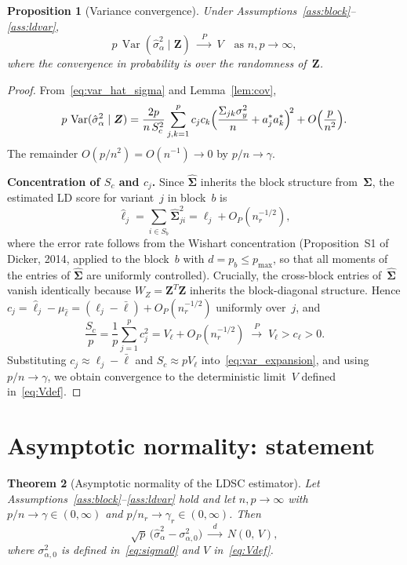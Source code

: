 \documentclass[11pt]{article}
\newcommand{\Var}{\operatorname{Var}}
\newcommand{\Z}{\bm{Z}}
\newcommand{\bSig}{\bm{\Sigma}}
\newcommand{\hSig}{\widehat{\bm{\Sigma}}}
\newtheorem{theorem}{Theorem}
\newtheorem{proposition}[theorem]{Proposition}
\begin{document}
\begin{proposition}[Variance convergence]\label{prop:variance}
Under Assumptions~\ref{ass:block}--\ref{ass:ldvar},
\[
  p\,\Var(\hat\sigma_\alpha^{2}\mid\Z)
  \;\xrightarrow{\;\;P\;\;}\; V
  \quad\text{as }n,p\to\infty,
\]
where the convergence in probability is over the randomness of~$\Z$.
\end{proposition}

\begin{proof}
From~\eqref{eq:var_hat_sigma} and Lemma~\ref{lem:cov},
\begin{equation}\label{eq:var_expansion}
  p\,\Var(\hat\sigma_\alpha^{2}\mid\Z)
  = \frac{2p}{n\,S_c^{2}}
    \sum_{j,k=1}^{p}c_jc_k
    \Bigl(\frac{\Sigma_{jk}\sigma_y^{2}}{n}+a_j^{*}a_k^{*}\Bigr)^{\!2}
    + O\Bigl(\frac{p}{n^{2}}\Bigr).
\end{equation}
The remainder $O(p/n^{2})=O(n^{-1})\to0$ by $p/n\to\gamma$.

\medskip
\noindent\textbf{Concentration of $S_c$ and $c_j$.}\;
Since $\hSig$ inherits the block structure from~$\bSig$, the estimated LD score
for variant~$j$ in block~$b$ is
\[
  \hat\ell_j
  = \sum_{i\in S_b}\hSig_{ji}^{2}
  = \ell_j + O_P(n_r^{-1/2}),
\]
where the error rate follows from the Wishart concentration
(Proposition~S1 of Dicker, 2014, applied to the block~$b$ with
$d=p_b\le p_{\max}$, so that all moments of the entries of $\hSig$ are
uniformly controlled).  Crucially, the cross-block entries of~$\hSig$ vanish
identically because $W_Z=\Z^{T}\Z$ inherits the block-diagonal structure.
Hence $c_j=\hat\ell_j-\mu_{\hat\ell}=(\ell_j-\bar\ell)+O_P(n_r^{-1/2})$
uniformly over~$j$, and
\[
  \frac{S_c}{p}
  = \frac{1}{p}\sum_{j=1}^{p}c_j^{2}
  = V_\ell + O_P(n_r^{-1/2})
  \;\xrightarrow{\;P\;}\; V_\ell > c_\ell > 0.
\]
Substituting $c_j\approx\ell_j-\bar\ell$ and $S_c\approx pV_\ell$
into~\eqref{eq:var_expansion}, and using $p/n\to\gamma$, we obtain
convergence to the deterministic limit~$V$ defined in~\eqref{eq:Vdef}.
\end{proof}

\section{Asymptotic normality: statement}\label{sec:statement}

\begin{theorem}[Asymptotic normality of the LDSC
estimator]\label{thm:main}
Let Assumptions~\ref{ass:block}--\ref{ass:ldvar} hold and let $n,p\to\infty$
with $p/n\to\gamma\in(0,\infty)$ and $p/n_r\to\gamma_r\in(0,\infty)$.  Then
\begin{equation}\label{eq:CLT}
  \sqrt{p}\,\bigl(\hat\sigma_\alpha^{2}-\sigma_{\alpha,0}^{2}\bigr)
  \;\xrightarrow{\;\;d\;\;}\; N(0,\,V),
\end{equation}
where $\sigma_{\alpha,0}^{2}$ is defined in~\eqref{eq:sigma0} and $V$ in~\eqref{eq:Vdef}.
\end{theorem}
\end{document}
